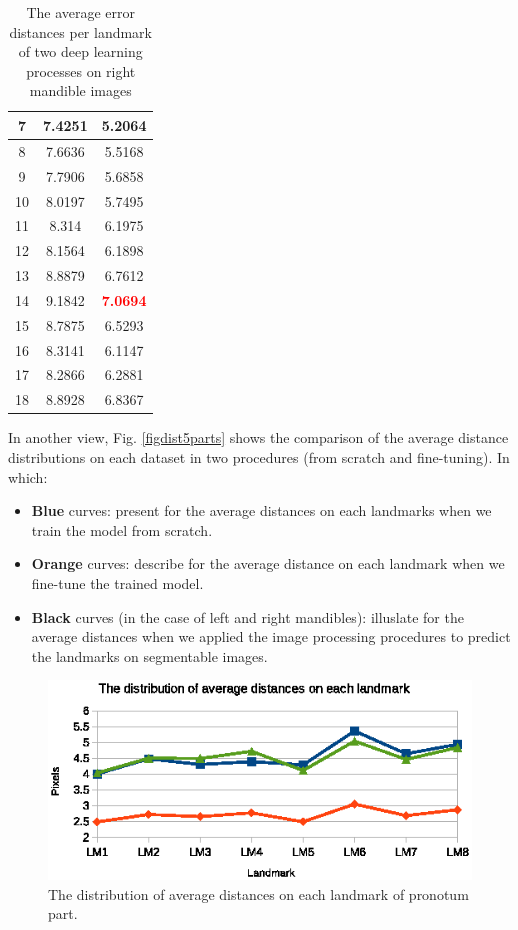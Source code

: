 \documentclass[review]{elsarticle}
\begin{document}
\begin{table}[htbp]
\begin{minipage}[t]{0.45\textwidth}
\begin{tabular}{|c|c|c|}
	7 & 7.4251 & 5.2064 \\ \hline
	8 & 7.6636 & 5.5168 \\ \hline
	9 & 7.7906 & 5.6858 \\ \hline
	10 & 8.0197 & 5.7495 \\ \hline
	11 & 8.314 & 6.1975 \\ \hline
	12 & 8.1564 & 6.1898 \\ \hline
	13 & 8.8879 & 6.7612 \\ \hline
	14 & 9.1842 & \textcolor{red}{\textbf{7.0694}} \\ \hline
	15 & 8.7875 & 6.5293 \\ \hline
	16 & 8.3141 & 6.1147 \\ \hline
	17 & 8.2866 & 6.2881 \\ \hline
	18 & 8.8928 & 6.8367 \\ \hline
\end{tabular}
\caption{The average error distances per landmark of two deep learning processes on right mandible images}
\label{tblcmpmd}
\end{minipage}
\end{table}

In another view, Fig. \ref{figdist5parts} shows the comparison of the average distance distributions on each dataset in two procedures (from scratch and fine-tuning). In which:
\begin{itemize}
	\item \textbf{Blue} curves: present for the average distances on each landmarks when we train the model from scratch.
	\item \textbf{Orange} curves: describe for the average distance on each landmark when we fine-tune the trained model.
	\item \textbf{Black} curves (in the case of left and right mandibles): illuslate for the average distances when we applied the image processing procedures to predict the landmarks on segmentable images.
\end{itemize}

\iffalse
\begin{figure}[htbp]
	\centerline{\includegraphics[scale=0.55]{images/prono_part}}
	\caption{The distribution of average distances on each landmark of pronotum part.}
	\label{figdistpronotum}
\end{figure}
\end{document}
